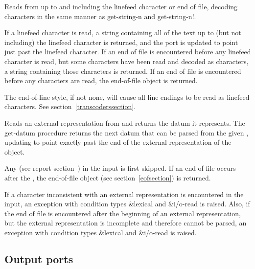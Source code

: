 \begin{entry}{%
}
   
Reads from  up to and including the linefeed
character or end of file, decoding characters in the same manner as
{\cf get-string-n} and {\cf get-string-n!}.
   
If a linefeed character is read, a string
containing all of the text up to (but not including) the linefeed
character is returned, and the port is updated to point just past the
linefeed character. If an end of file is
encountered before any linefeed character is read, but some characters
have been read and decoded as characters, a string containing
those characters is returned. If an end of file is encountered before
any characters are read, the end-of-file object is
returned.

\begin{note}
  The end-of-line style, if not {\cf none}, will cause all line
  endings to be read as linefeed characters.  See
  section~\ref{transcoderssection}.
\end{note}
\end{entry}

\begin{entry}{%
}
 
Reads an external representation from  and returns the
datum it represents.  The {\cf get-datum} procedure returns the next
datum that can be parsed from the given , updating
 to point exactly past the end of the external
representation of the object.

Any 
(see report section~) in
the input is first skipped.  If an end of file occurs after the
, the end-of-file object (see
section~\ref{eofsection}) is returned.

If a character inconsistent with an external representation is
encountered in the input, an exception with condition types
{\cf\&lexical} and {\cf\&i/o-read} is raised.
Also, if the end of file is encountered
after the beginning of an external representation, but the external
representation is incomplete and therefore cannot be parsed, an exception
with condition types {\cf\&lexical} and {\cf\&i/o-read} is raised.
\end{entry}

\subsection{Output ports}

